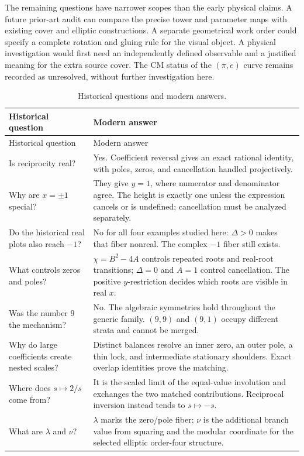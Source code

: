 The remaining questions have narrower scopes than the early physical claims. A future prior-art audit can compare the precise tower and parameter maps with existing cover and elliptic constructions. A separate geometrical work order could specify a complete rotation and gluing rule for the visual object. A physical investigation would first need an independently defined observable and a justified meaning for the extra source cover. The CM status of the \((\pi,e)\) curve remains recorded as unresolved, without further investigation here.

\begin{longtable}{L{51mm}L{101mm}}
\caption{Historical questions and modern answers.}\label{tab:lessons}\\
\toprule Historical question & Modern answer\\\midrule\endfirsthead
\toprule Historical question & Modern answer\\\midrule\endhead
Is reciprocity real? & Yes. Coefficient reversal gives an exact rational identity, with poles, zeros, and cancellation handled projectively.\\
Why are \(x=\pm1\) special? & They give \(y=1\), where numerator and denominator agree. The height is exactly one unless the expression cancels or is undefined; cancellation must be analyzed separately.\\
Do the historical real plots also reach \(-1\)? & No for all four examples studied here: \(\Delta>0\) makes that fiber nonreal. The complex \(-1\) fiber still exists.\\
What controls zeros and poles? & \(\chi=B^2-4A\) controls repeated roots and real-root transitions; \(\Delta=0\) and \(A=1\) control cancellation. The positive \(y\)-restriction decides which roots are visible in real \(x\).\\
Was the number \(9\) the mechanism? & No. The algebraic symmetries hold throughout the generic family. \((9,9)\) and \((9,1)\) occupy different strata and cannot be merged.\\
Why do large coefficients create nested scales? & Distinct balances resolve an inner zero, an outer pole, a thin lock, and intermediate stationary shoulders. Exact overlap identities prove the matching.\\
Where does \(s\mapsto2/s\) come from? & It is the scaled limit of the equal-value involution and exchanges the two matched contributions. Reciprocal inversion instead tends to \(s\mapsto-s\).\\
What are \(\lambda\) and \(\nu\)? & \(\lambda\) marks the zero/pole fiber; \(\nu\) is the additional branch value from squaring and the modular coordinate for the selected elliptic order-four structure.\\

\end{longtable}

